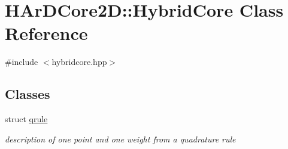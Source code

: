 \hypertarget{classHArDCore2D_1_1HybridCore}{}\section{H\+Ar\+D\+Core2D\+:\+:Hybrid\+Core Class Reference}
\label{classHArDCore2D_1_1HybridCore}


{\ttfamily \#include $<$hybridcore.\+hpp$>$}

\subsection*{Classes}
\begin{DoxyCompactItemize}
\item 
struct \hyperlink{structHArDCore2D_1_1HybridCore_1_1qrule}{qrule}
\begin{DoxyCompactList}\small\item\em description of one point and one weight from a quadrature rule \end{DoxyCompactList}\end{DoxyCompactItemize}
